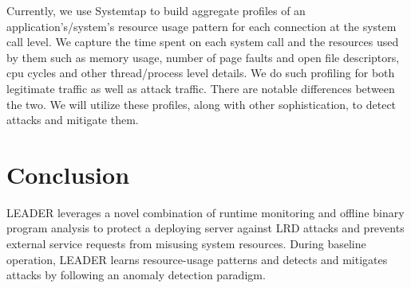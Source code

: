 \documentclass[conference]{IEEEtran}
\begin{document}
Currently, we use Systemtap \cite{systemtap} to build aggregate profiles of an application's/system's resource usage pattern for each connection at the system call level. We capture the time spent on each system call and the resources used by them such as memory usage, number of page faults and open file descriptors, cpu cycles and other thread/process level details. We do such profiling for both legitimate traffic as well as attack traffic. There are notable differences between the two. We will utilize these profiles, along with other sophistication, to detect attacks and mitigate them. 




\section{Conclusion}
LEADER leverages a novel combination of runtime monitoring and offline binary program analysis to protect a deploying server against LRD attacks and prevents external service requests from misusing system resources. During baseline operation, LEADER learns resource-usage patterns and detects and mitigates attacks by following an anomaly detection paradigm.














%
%
%
\end{document}
